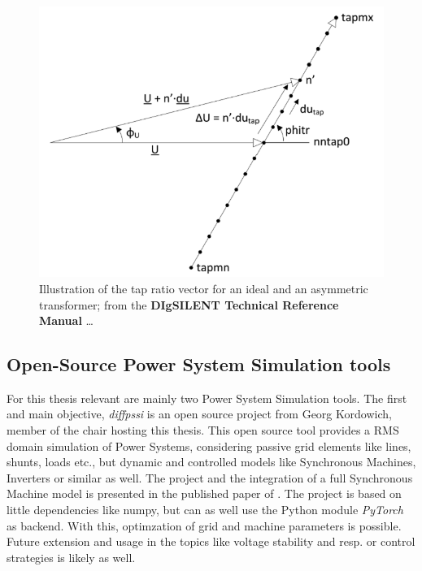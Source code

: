 \begin{figure}[htb!]
        \centering
        \includegraphics[width=.7\linewidth]{images/modeling/asymetric_ratio_vector.png}
        \caption[Illustration of the tap ratio vector for an ideal and an asymmetric transformer]{Illustration of the tap ratio vector for an ideal and an asymmetric transformer; from the \textcolor{ees_red}{\textbf{DIgSILENT Technical Reference Manual}} \dots \quelle}
        \label{fig:asymetric-ratio-vector}
\end{figure}

\subsection{Open-Source Power System Simulation tools}
\label{sec:simulation-tools}

For this thesis relevant are mainly two Power System Simulation tools.
The first and main objective, \textit{diffpssi} is an open source project from Georg Kordowich, member of the chair hosting this thesis.
This open source tool provides a \acs{RMS} domain simulation of Power Systems, considering passive grid elements like lines, shunts, loads etc., but dynamic and controlled models like Synchronous Machines, Inverters or similar as well.
The project and the integration of a full Synchronous Machine model is presented in the published paper of \textcite{kordowich_2023}.
The project is based on little dependencies like numpy, but can as well use the Python module \textit{PyTorch} as backend.
With this, optimzation of grid and machine parameters is possible.
Future extension and usage in the topics like voltage stability and resp. or control strategies is likely as well.

